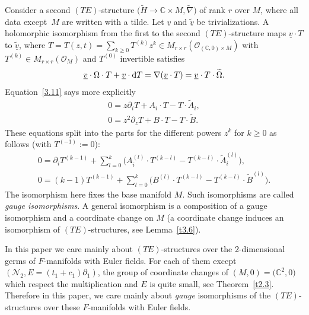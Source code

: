 \documentclass[10pt,a4paper]{amsart}
\numberwithin{equation}{section}
\numberwithin{figure}{section}
\newcommand{\C}{{\mathbb C}}
\newcommand{\NN}{{\mathcal N}}
\newcommand{\OO}{{\mathcal O}}
\newcommand{\ddd}{{\rm d}}
\newcommand{\www}{\widetilde}
\newcommand{\uuuu}{\underline}
\newcommand{\paa}{\partial}
\newcommand{\nnn}{\nabla}
\begin{document}
\begin{Remark}
Consider a second $(TE)$-structure
$\big(\www H\to\C\times M,\www\nnn\big)$ of rank $r$ over $M$,
where all data except~$M$ are written with a tilde.
Let $\uuuu{v}$ and $\uuuu{\www v}$ be trivializations.
A holomorphic isomorphism from the first to the second
$(TE)$-structure maps $\uuuu{v}\cdot T$ to $\uuuu{\www v}$,
where
$T=T(z,t) =\sum_{k\geq 0}T^{(k)}z^k\in M_{r\times r}(\OO_{(\C,0)\times M})$
with $T^{(k)}\in M_{r\times r}(\OO_{M})$ and $T^{(0)}$
invertible satisfies
\begin{gather}\label{3.11}
\uuuu{v}\cdot\Omega\cdot T+\uuuu{v}\cdot\ddd T=
\nnn(\uuuu{v}\cdot T)=\uuuu{v}\cdot T\cdot\www\Omega.
\end{gather}
Equation~\eqref{3.11} says more explicitly
\begin{gather}\label{3.12}
0= z\paa_i T+A_i\cdot T-T\cdot\www A_i,
\\
0= z^2\paa_z T+B\cdot T-T\cdot \www B.\label{3.13}
\end{gather}
These equations split into the parts for the different
powers $z^k$ for $k\geq 0$ as follows (with $T^{(-1)}:=0$):
\begin{gather*}%
0= \paa_i T^{(k-1)}+\sum_{l=0}^k \big(A_i^{(l)}\cdot T^{(k-l)}
-T^{(k-l)}\cdot\www A_i^{(l)}\big),
\\
0= (k-1)T^{(k-1)}+\sum_{l=0}^k\big(B^{(l)}\cdot T^{(k-l)}
-T^{(k-l)}\cdot \www B^{(l)}\big).%
\end{gather*}
The isomorphism here fixes the base manifold $M$.
Such isomorphisms are called {\it gauge iso\-mor\-phisms}.
A general isomorphism is a composition of a
gauge isomorphism and a coordinate change on $M$
(a coordinate change induces an isomorphism of
$(TE)$-structures, see Lemma~\ref{t3.6}).
\end{Remark}

\begin{Remark}%
In this paper we care mainly about $(TE)$-structures
over the 2-dimensional germs of $F$-manifolds with
Euler fields. For each of them except
$(\NN_2,E=(t_1+c_1)\paa_1)$, the group of coordinate
changes of $(M,0)=\big(\C^2,0\big)$ which respect the multiplication
and $E$ is quite small, see Theorem~\ref{t2.3}.
Therefore in this paper, we care mainly about {\it gauge}
isomorphisms of the $(TE)$-structures over these
$F$-manifolds with Euler fields.
\end{Remark}
\end{document}
